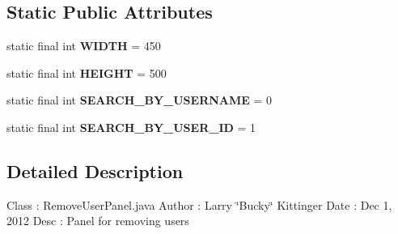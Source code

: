\subsection*{Static Public Attributes}
\begin{DoxyCompactItemize}
\item 
\hypertarget{classw3se_1_1_view_1_1_subpanels_1_1_remove_user_panel_ab3880941d6fe3e964fcd25dcc9323b6e}{static final int {\bfseries W\-I\-D\-T\-H} = 450}\label{classw3se_1_1_view_1_1_subpanels_1_1_remove_user_panel_ab3880941d6fe3e964fcd25dcc9323b6e}

\item 
\hypertarget{classw3se_1_1_view_1_1_subpanels_1_1_remove_user_panel_a286679d20e281933a556f66a8f212d0e}{static final int {\bfseries H\-E\-I\-G\-H\-T} = 500}\label{classw3se_1_1_view_1_1_subpanels_1_1_remove_user_panel_a286679d20e281933a556f66a8f212d0e}

\item 
\hypertarget{classw3se_1_1_view_1_1_subpanels_1_1_remove_user_panel_aa32d3b25602b2e52ab8bd02b55c630a5}{static final int {\bfseries S\-E\-A\-R\-C\-H\-\_\-\-B\-Y\-\_\-\-U\-S\-E\-R\-N\-A\-M\-E} = 0}\label{classw3se_1_1_view_1_1_subpanels_1_1_remove_user_panel_aa32d3b25602b2e52ab8bd02b55c630a5}

\item 
\hypertarget{classw3se_1_1_view_1_1_subpanels_1_1_remove_user_panel_aadc23b86f06601d9f695e8022f52f985}{static final int {\bfseries S\-E\-A\-R\-C\-H\-\_\-\-B\-Y\-\_\-\-U\-S\-E\-R\-\_\-\-I\-D} = 1}\label{classw3se_1_1_view_1_1_subpanels_1_1_remove_user_panel_aadc23b86f06601d9f695e8022f52f985}

\end{DoxyCompactItemize}


\subsection{Detailed Description}
Class \-: Remove\-User\-Panel.\-java Author \-: Larry \char`\"{}\-Bucky\char`\"{} Kittinger Date \-: Dec 1, 2012 Desc \-: Panel for removing users 

